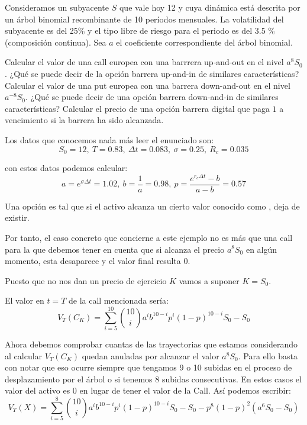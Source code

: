 \begin{problem}[2]
Consideramos un subyacente $S$ que vale hoy 12 y cuya dinámica está descrita por un árbol binomial recombinante de 10 períodos mensuales. La volatilidad del subyacente es del 25\% y el tipo libre de riesgo para el periodo es del 3.5 \% (composición continua). Sea $a$ el coeficiente correspondiente del árbol binomial.

\ppart Calcular el valor de una call europea con una barrrera up-and-out en el nivel $a^8S_0$.
\ppart ¿Qué se puede decir de la opción barrera up-and-in de similares características?
\ppart Calcular el valor de una put europea con una barrera down-and-out en el nivel $a^{-8}S_0$.
\ppart ¿Qué se puede decir de una opción barrera down-and-in de similares características?
\ppart Calcular el precio de una opción barrera digital que paga $1$ a vencimiento si la barrera ha sido alcanzada.

\solution


Los datos que conocemos nada más leer el enunciado son:
\[S_0=12, \ T=0.83, \ Δt = 0.083, \ σ=0.25, \ R_c=0.035\]

con estos datos podemos calcular:
\[a=e^{σΔt} = 1.02, \ b = \frac{1}{a} = 0.98, \ p = \frac{e^{r_cΔt}-b}{a-b}=0.57\]

\spart

Una opción  es tal que si el activo alcanza un cierto valor conocido como , deja de existir.

Por tanto, el caso concreto que concierne a este ejemplo no es más que una call para la que debemos tener en cuenta que si alcanza el precio $a^8S_0$ en algún momento, esta desaparece y el valor final resulta 0.

Puesto que no nos dan un precio de ejercicio $K$ vamos a suponer $K=S_0$.

El valor en $t=T$ de la call mencionada sería:
\[V_T(C_K) = \sum_{i=5}^{10}{10 \choose i}a^{i}b^{10-i}p^i(1-p)^{10-i}S_0-S_0\]

Ahora debemos comprobar cuantas de las trayectorias que estamos considerando al calcular $V_T(C_K)$ quedan anuladas por alcanzar el valor $a^8S_0$. Para ello basta con notar que eso ocurre siempre que tengamos 9 o 10 subidas en el proceso de desplazamiento por el árbol o si tenemos 8 subidas consecutivas. En estos casos el valor del activo es 0 en lugar de tener el valor de la Call. Así podemos escribir:
\[V_T(X)=\sum_{i=5}^{8}{10 \choose i}a^{i}b^{10-i}p^i(1-p)^{10-i}S_0-S_0-p^8(1-p)^2(a^6S_0-S_0)\]


\end{problem}

